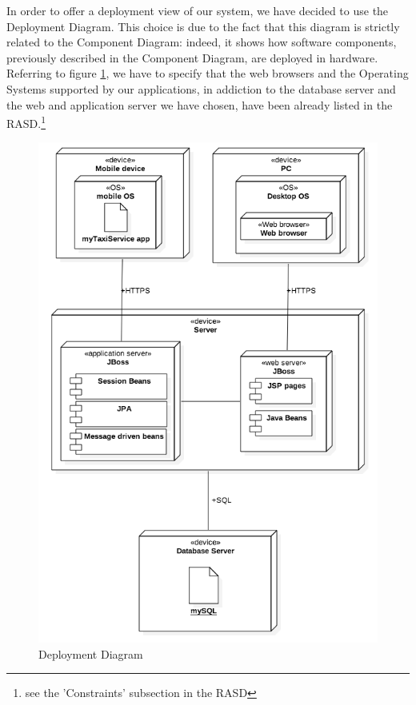 In order to offer a deployment view of our system, we have decided to use the Deployment Diagram. This choice is due to the fact that this diagram is strictly related to the Component Diagram: indeed, it shows how software components, previously described in the Component Diagram, are deployed in hardware. 
\newline
Referring to figure \ref{fig:deployment-diagram}, we have to specify that the web browsers and the Operating Systems supported by our applications, in addiction to the database server and the web and application server we have chosen, have been already listed in the RASD.\footnote{see the 'Constraints' subsection in the RASD}

\begin{figure}[H]
            \centering
            \includegraphics[width=12cm]{./Images/DeploymentDiagram.png}
            \caption{Deployment Diagram}
            \label{fig:deployment-diagram}
\end{figure}
